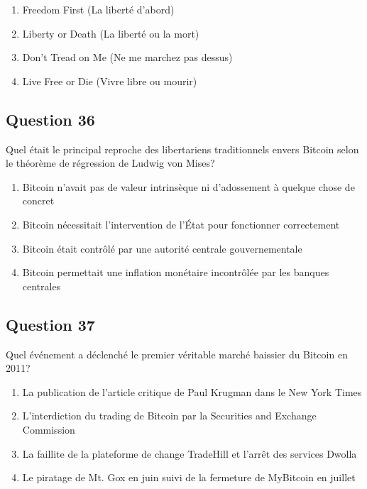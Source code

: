 \documentclass[12pt,a4paper]{article}
\begin{document}
\begin{enumerate}[label=\Alph*., leftmargin=*]
\item Freedom First (La liberté d'abord)
\item Liberty or Death (La liberté ou la mort)
\item Don't Tread on Me (Ne me marchez pas dessus)
\item Live Free or Die (Vivre libre ou mourir)
\end{enumerate}

\bigskip


\subsection*{Question 36}
Quel était le principal reproche des libertariens traditionnels envers Bitcoin selon le théorème de régression de Ludwig von Mises?

\begin{enumerate}[label=\Alph*., leftmargin=*]
\item Bitcoin n'avait pas de valeur intrinsèque ni d'adossement à quelque chose de concret
\item Bitcoin nécessitait l'intervention de l'État pour fonctionner correctement
\item Bitcoin était contrôlé par une autorité centrale gouvernementale
\item Bitcoin permettait une inflation monétaire incontrôlée par les banques centrales
\end{enumerate}

\bigskip


\subsection*{Question 37}
Quel événement a déclenché le premier véritable marché baissier du Bitcoin en 2011?

\begin{enumerate}[label=\Alph*., leftmargin=*]
\item La publication de l'article critique de Paul Krugman dans le New York Times
\item L'interdiction du trading de Bitcoin par la Securities and Exchange Commission
\item La faillite de la plateforme de change TradeHill et l'arrêt des services Dwolla
\item Le piratage de Mt. Gox en juin suivi de la fermeture de MyBitcoin en juillet
\end{enumerate}
\end{document}

